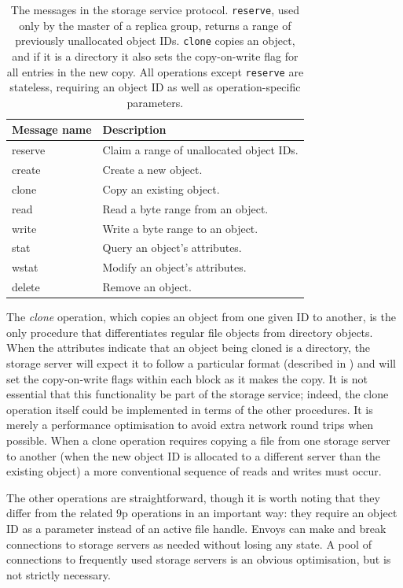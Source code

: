 \begin{table}[t]
\begin{center}
\begin{tabular}{>{\ttfamily}l|l}
\textbf{\textrm{Message name}} & \textbf{Description} \\ \hline
reserve & Claim a range of unallocated object IDs. \\
create & Create a new object. \\
clone & Copy an existing object. \\
read & Read a byte range from an object. \\
write & Write a byte range to an object. \\
stat & Query an object's attributes. \\
wstat & Modify an object's attributes. \\
delete & Remove an object. \\
\end{tabular}
\end{center}
\caption[Additional message in the storage service protocol]{The messages in the storage service protocol. \texttt{reserve}, used only by the master of a replica group, returns a range of previously unallocated object IDs. \texttt{clone} copies an object, and if it is a directory it also sets the copy-on-write flag for all entries in the new copy. All operations except \texttt{reserve} are stateless, requiring an object ID as well as operation-specific parameters.}
\label{tab:storage-messages}
\end{table}

The \emph{clone} operation, which copies an object from one given ID to another, is the only procedure that differentiates regular file objects from directory objects. When the attributes indicate that an object being cloned is a directory, the storage server will expect it to follow a particular format (described in ) and will set the copy-on-write flags within each block as it makes the copy. It is not essential that this functionality be part of the storage service; indeed, the clone operation itself could be implemented in terms of the other procedures. It is merely a performance optimisation to avoid extra network round trips when possible. When a clone operation requires copying a file from one storage server to another (when the new object ID is allocated to a different server than the existing object) a more conventional sequence of reads and writes must occur.

The other operations are straightforward, though it is worth noting that they differ from the related 9p operations in an important way: they require an object ID as a parameter instead of an active file handle. Envoys can make and break connections to storage servers as needed without losing any state. A pool of connections to frequently used storage servers is an obvious optimisation, but is not strictly necessary.

